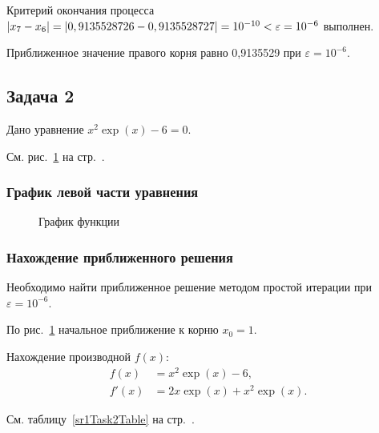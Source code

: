 \documentclass[10pt, a4paper, titlepage]{article}
\newcommand*{\hm}[1]{#1\nobreak\discretionary{}{\hbox{$\mathsurround=0pt #1$}}{}} %
\begin{document}
Критерий окончания процесса $|x_7-x_6|=|0,9135528726-0,9135528727| \hm =10^{-10}<\varepsilon=10^{-6}$ выполнен. 

Приближенное значение правого корня равно 0,9135529 при $\varepsilon=10^{-6}$.

\subsection{Задача 2}

Дано уравнение $x^2\exp(x)-6=0$.

См. рис.~\ref{sr1Task2Function} на стр.~\pageref{sr1Task2Function}.

\subsubsection*{График левой части уравнения}

\begin{figure}[htb]
    \centering
    \caption{График функции}
    \label{sr1Task2Function}
\end{figure}

\subsubsection*{Нахождение приближенного решения}

Необходимо найти приближенное решение методом простой итерации при $\varepsilon=10^{-6}$.

По рис.~\ref{sr1Task2Function} начальное приближение к корню $x_0=1$.

Нахождение производной $f(x)$:
\begin{align*}
f(x) &= x^2\exp(x)-6, \\ 
f'(x) &= 2x\exp(x)+x^2\exp(x).
\end{align*}

См. таблицу~\ref{sr1Task2Table} на стр.~\pageref{sr1Task2Table}.
\end{document}
